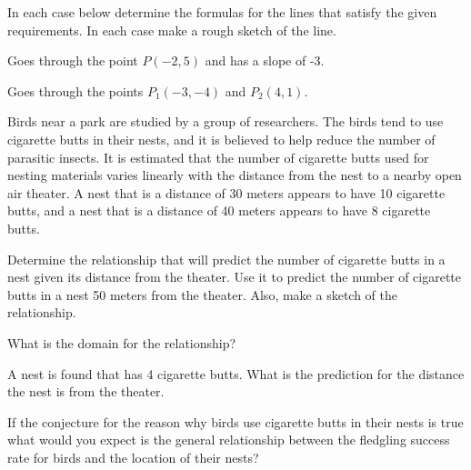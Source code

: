 \begin{problem}
\item In each case below determine the formulas for the lines that
  satisfy the given requirements. In each case make a rough sketch of
  the line.

  \begin{subproblem}
  \item Goes through the point $P(-2,5)$ and has a slope of -3.
    \vfill
  \item Goes through the points $P_1(-3,-4)$ and $P_2(4,1)$.
    \vfill
  \end{subproblem}

  \clearpage

\item Birds near a park are studied by a group of researchers. The
  birds tend to use cigarette butts in their nests, and it is believed
  to help reduce the number of parasitic insects. It is estimated that
  the number of cigarette butts used for nesting materials varies
  linearly with the distance from the nest to a nearby open air
  theater. A nest that is a distance of 30 meters appears to have 10
  cigarette butts, and a nest that is a distance of 40 meters appears
  to have 8 cigarette butts.
  \begin{subproblem}
  \item Determine the relationship that will predict the number of
    cigarette butts in a nest given its distance from the theater.
    Use it to predict the number of cigarette butts in a nest 50
    meters from the theater. Also, make a sketch of the relationship.

    \vfill 
    \vfill
    \vfill

  \item What is the domain for the relationship?
    \vfill
  \item A nest is found that has 4 cigarette butts. What is the
    prediction for the distance the nest is from the theater.
    \vfill
  \item If the conjecture for the reason why birds use cigarette butts
    in their nests is true what would you expect is the general
    relationship between the fledgling success rate for birds and the
    location of their nests?
  \end{subproblem}


\end{problem}

\postClass

